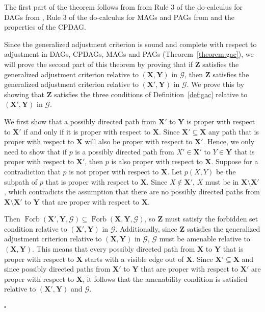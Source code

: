 \documentclass[11pt,a4paper]{article}
\newenvironment{proofof}[1][]{\begin{trivlist}
   \item[\hskip \labelsep {\bfseries Proof of #1.}]}{\hfill{}$\square$\end{trivlist}}
\DeclareMathOperator{\Forbi}{Forb}
\newcommand{\amen}{the amenability condition\xspace}
\newcommand{\forb}{the forbidden set condition\xspace}
\newcommand{\g}[1][G]{\mathcal{#1}}
\newcommand{\fb}[2][X,Y]{\Forbi(\mathbf{#1},#2)}%
\begin{document}
\begin{proofof}[Theorem~\ref{thm:preprocessing}]
The first part of the theorem follows from from Rule 3 of the do-calculus  for DAGs from \cite{Pearl2009}, Rule 3 of the do-calculus for MAGs and PAGs from \cite{zhang2006causal} and the properties of the CPDAG.

Since the generalized adjustment criterion is sound and complete with respect to adjustment in DAGs, CPDAGs, MAGs and PAGs (Theorem~\ref{theorem:gac}), we will prove the second part of this theorem by proving that if $\mathbf{Z}$ satisfies the generalized adjustment criterion relative to $(\mathbf{X,Y})$ in $\g$, then $\mathbf{Z}$ satisfies the generalized adjustment criterion relative to $(\mathbf{X',Y})$ in $\g$. We prove this by showing that $\mathbf{Z}$ satisfies the three conditions of Definition~\ref{def:gac} relative to $(\mathbf{X',Y})$ in $\g$.

We first show that a possibly directed path from $\mathbf{X'}$ to $\mathbf{Y}$ is proper with respect to $\mathbf{X'}$ if and only if it is proper with respect to $\mathbf{X}$. Since $\mathbf{X'} \subseteq \mathbf{X}$ any path that is proper with respect to $\mathbf{X}$ will also be proper with respect to $\mathbf{X'}$. Hence, we only need to show that if $p$ is a possibly directed path from $X' \in \mathbf{X'}$ to $Y \in \mathbf{Y}$ that is proper with respect to $\mathbf{X'}$, then $p$ is also proper with respect to $\mathbf{X}$. Suppose for a contradiction that $p$ is not proper with respect to $\mathbf{X}$. Let $p(X,Y)$ be the subpath of $p$ that is proper with respect to $\mathbf{X}$. Since $X \notin \mathbf{X'}$, $X$ must be in $\mathbf{X} \setminus \mathbf{X'}$, which contradicts the assumption that there are no possibly directed paths from $\mathbf{X} \setminus \mathbf{X'}$ to $\mathbf{Y}$ that are proper with respect to $\mathbf{X}$.

Then $\fb[\mathbf{X',Y}]{\g} \subseteq \fb{\g}$, so $\mathbf{Z}$ must satisfy \forb{} relative to $\mathbf{(X',Y)}$ in $\g$.
Additionally, since $\mathbf{Z}$ satisfies the generalized adjustment criterion relative to $(\mathbf{X,Y})$ in $\g$, $\g$ must be amenable relative to $(\mathbf{X,Y})$. This means that every possibly directed path from $\mathbf{X}$ to $\mathbf{Y}$ that is proper with respect to $\mathbf{X}$ starts with a visible edge out of $\mathbf{X}$. Since $\mathbf{X'} \subseteq \mathbf{X}$ and since possibly directed paths from $\mathbf{X'}$ to $\mathbf{Y}$ that are proper with respect to $\mathbf{X'}$ are proper with respect to $\mathbf{X}$, it follows that \amen{} is satisfied relative to $(\mathbf{X',Y})$ and $\g$.



\end{proofof}
\end{document}
